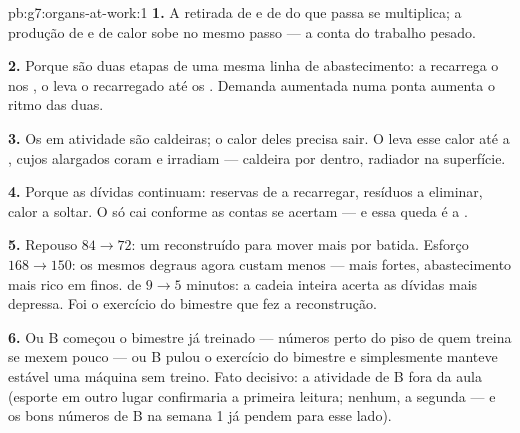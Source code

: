 \begin{solution}{pb:g7:organs-at-work:1}
\textbf{1.} A retirada de  e de  do  que passa se
multiplica; a produção de  e de calor sobe no mesmo passo
--- a conta do trabalho pesado.

\textbf{2.} Porque são duas etapas de uma mesma linha de
abastecimento: a  recarrega o  nos , o 
leva o  recarregado até os . Demanda aumentada numa
ponta aumenta o ritmo das duas.

\textbf{3.} Os  em atividade são caldeiras; o calor deles
precisa sair. O  leva esse calor até a , cujos 
alargados coram e irradiam --- caldeira por dentro, radiador na
superfície.

\textbf{4.} Porque as dívidas continuam: reservas de  a
recarregar, resíduos a eliminar, calor a soltar. O  só cai
conforme as contas se acertam --- e essa queda é a .

\textbf{5.} Repouso $84 \to 72$: um  reconstruído para mover
mais por batida. Esforço $168 \to 150$: os mesmos degraus agora custam
menos ---  mais fortes, abastecimento mais rico em  finos.
 de $9 \to 5$ minutos: a cadeia inteira acerta as dívidas
mais depressa. Foi o exercício do bimestre que fez a reconstrução.

\textbf{6.} Ou B começou o bimestre já treinado --- números perto do
piso de quem treina se mexem pouco --- ou B pulou o exercício do
bimestre e simplesmente manteve estável uma máquina sem treino. Fato
decisivo: a atividade de B fora da aula (esporte em outro lugar
confirmaria a primeira leitura; nenhum, a segunda --- e os bons números
de B na semana 1 já pendem para esse lado).


\end{solution}

